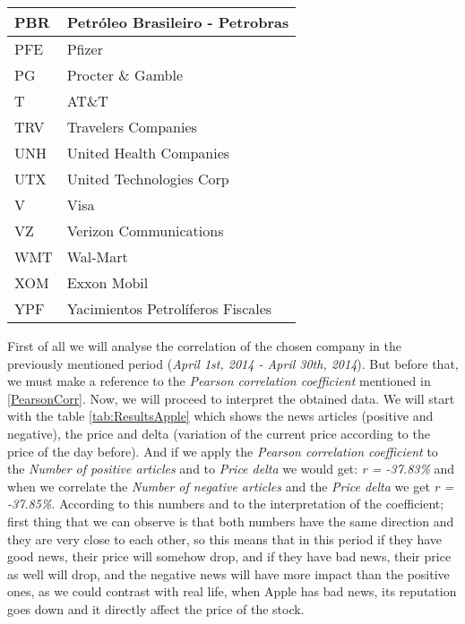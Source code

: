 \begin{table}
\begin{tabular}{ | p{3cm\textwidth} | p{7cm\textwidth} |}
PBR    & Petróleo Brasileiro - Petrobras   \\\hline
PFE    & Pfizer                            \\\hline
PG     & Procter \& Gamble                 \\\hline
T      & AT\&T                             \\\hline
TRV    & Travelers Companies               \\\hline
UNH    & United Health Companies           \\\hline
UTX    & United Technologies Corp          \\\hline
V      & Visa                              \\\hline
VZ     & Verizon Communications            \\\hline
WMT    & Wal-Mart                          \\\hline
XOM    & Exxon Mobil                       \\\hline
YPF    & Yacimientos Petrolíferos Fiscales \\\hline

    \end{tabular}
\end{table}

First of all we will analyse the correlation of the chosen company in the previously mentioned period (\emph{April 1st, 2014 - April 30th, 2014}). But before that, we must make a reference to the \emph{Pearson correlation coefficient} mentioned in \ref{PearsonCorr}. Now, we will proceed to interpret the obtained data. We will start with the table \ref{tab:ResultsApple} which shows the news articles (positive and negative), the price and delta (variation of the current price according to the price of the day before). And if we apply the \emph{Pearson correlation coefficient} to the \emph{Number of positive articles} and to \emph{Price delta} we would get: \emph{r = -37.83\%} and when we correlate the \emph{Number of negative articles} and the \emph{Price delta} we get \emph{r = -37.85\%}. According to this numbers and to the interpretation of the coefficient; first thing that we can observe is that both numbers have the same direction and they are very close to each other, so this means that in this period if they have good news, their price will somehow drop, and if they have bad news, their price as well will drop, and the negative news will have more impact than the positive ones, as we could contrast with real life, when Apple has bad news, its reputation goes down and it directly affect the price of the stock.


